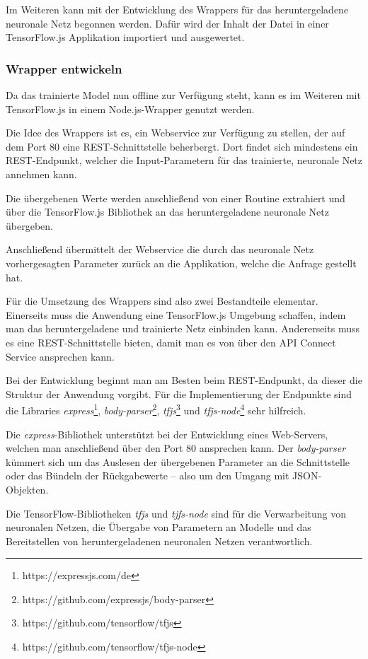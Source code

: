 Im Weiteren kann mit der Entwicklung des Wrappers für das heruntergeladene neuronale Netz begonnen werden. Dafür wird
der Inhalt der Datei in einer TensorFlow.js Applikation importiert und ausgewertet.

\subsubsection{Wrapper entwickeln}
Da das trainierte Model nun offline zur Verfügung steht, kann es im Weiteren mit TensorFlow.js in einem Node.js-Wrapper
genutzt werden.

Die Idee des Wrappers ist es, ein Webservice zur Verfügung zu stellen, der auf dem Port 80 eine REST-Schnittstelle
beherbergt. Dort findet sich mindestens ein REST-Endpunkt, welcher die Input-Parametern für das trainierte,
neuronale Netz annehmen kann.

Die übergebenen Werte werden anschließend von einer Routine extrahiert und über die TensorFlow.js Bibliothek an das
heruntergeladene neuronale Netz übergeben.

Anschließend übermittelt der Webservice die durch das neuronale Netz vorhergesagten Parameter zurück an die Applikation,
welche die Anfrage gestellt hat.

Für die Umsetzung des Wrappers sind also zwei Bestandteile elementar. Einerseits muss die Anwendung eine TensorFlow.js
Umgebung schaffen, indem man das heruntergeladene und trainierte Netz einbinden kann. Andererseits muss es eine
REST-Schnittstelle bieten, damit man es von über den API Connect Service ansprechen kann.

Bei der Entwicklung beginnt man am Besten beim REST-Endpunkt, da dieser die Struktur der Anwendung vorgibt. Für die
Implementierung der Endpunkte sind die Libraries \textit{express}\footnote{https://expressjs.com/de},
\textit{body-parser}\footnote{https://github.com/expressjs/body-parser}, \textit{tfjs}\footnote{https://github.com/tensorflow/tfjs} 
und \textit{tfjs-node}\footnote{https://github.com/tensorflow/tfjs-node} sehr hilfreich.

Die \textit{express}-Bibliothek unterstützt bei der Entwicklung eines Web-Servers, welchen man anschließend über den
Port 80 ansprechen kann. Der \textit{body-parser} kümmert sich um das Auslesen der übergebenen Parameter an die
Schnittstelle oder das Bündeln der Rückgabewerte -- also um den Umgang mit JSON-Objekten.

Die TensorFlow-Bibliotheken \textit{tfjs} und \textit{tjfs-node} sind für die Verwarbeitung von neuronalen Netzen,
die Übergabe von Parametern an Modelle und das Bereitstellen von heruntergeladenen neuronalen Netzen verantwortlich.

